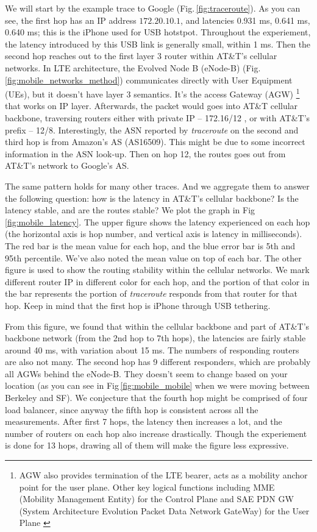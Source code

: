 We will start by the example trace to Google (Fig.\,\ref{fig:traceroute}). As you can see, the first hop has an IP address $172.20.10.1$, and latencies 0.931 ms, 0.641 ms, 0.640 ms; this is the iPhone used for USB hotstpot. Throughout the experiement, the latency introduced by this USB link is generally small, within 1 ms. Then the second hop reaches out to the first layer 3 router within AT\&T's cellular networks. In LTE architecture, the Evolved Node B (eNode-B) (Fig.\,\ref{fig:mobile_networks_method}) communicates directly with User Equipment (UEs), but it doesn't have layer 3 semantics. It's the access Gateway (AGW) \footnote{AGW also provides termination of the LTE bearer, acts as a mobility anchor point for the user plane. Other key logical functions including MME (Mobility Management Entity) for the Control Plane and SAE PDN GW (System Architecture Evolution Packet Data Network GateWay) for the User Plane \cite{nortel}} that works on IP layer. Afterwards, the packet would goes into AT\&T cellular backbone, traversing routers either with private IP -- 172.16/12 \cite{rekhterrfc}, or with AT\&T's prefix -- 12/8. Interestingly, the ASN reported by {\it traceroute} on the second and third hop is from Amazon's AS (AS16509). This might be due to some incorrect information in the ASN look-up. Then on hop 12, the routes goes out from AT\&T's network to Google's AS.

The same pattern holds for many other traces. And we aggregate them to answer the following question: how is the latency in AT\&T's cellular backbone? Is the latency stable, and are the routes stable? We plot the graph in Fig\,\ref{fig:mobile_latency}. The upper figure shows the latency experienced on each hop (the horizontal axis is hop number, and vertical axis is latency in milliseconds). The red bar is the mean value for each hop, and the blue error bar is 5th and 95th percentile. We've also noted the mean value on top of each bar. The other figure is used to show the routing stability within the cellular networks. We mark different router IP in different color for each hop, and the portion of that color in the bar represents the portion of {\it traceroute} responds from that router for that hop. Keep in mind that the first hop is iPhone through USB tethering. 

From this figure, we found that within the cellular backbone and part of AT\&T's backbone network (from the 2nd hop to 7th hops), the latencies are fairly stable around 40 ms, with variation about 15 ms. The numbers of responding routers are also not many. The second hop has 9 different responders, which are probably all AGWs behind the eNode-B. They doesn't seem to change based on your location (as you can see in Fig\,\ref{fig:mobile_mobile} when we were moving between Berkeley and SF). We conjecture that the fourth hop might be comprised of four load balancer, since anyway the fifth hop is consistent across all the measurements. After first 7 hops, the latency then increases a lot, and the number of routers on each hop also increase drastically. Though the experiement is done for 13 hops, drawing all of them will make the figure less expressive.

